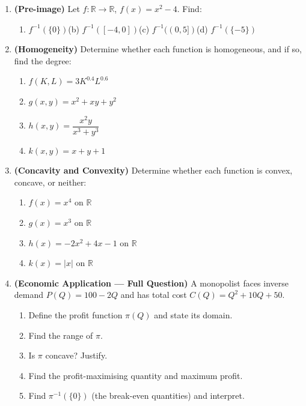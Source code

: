 \documentclass[12pt, a4paper]{article}
\theoremstyle{definition}
\newcommand{\R}{\mathbb{R}}
\begin{document}
\begin{enumerate}[label=\textbf{B\arabic*.}, leftmargin=2.5em]
  \item \textbf{(Pre-image)} Let $f:\R\to\R$, $f(x) = x^2 - 4$. Find:
  \begin{enumerate}[label=(\alph*)]
    \item $f^{-1}(\{0\})$\quad (b) $f^{-1}([-4, 0])$\quad (c) $f^{-1}((0,5])$\quad (d) $f^{-1}(\{-5\})$
  \end{enumerate}
\newpage
  \item \textbf{(Homogeneity)} Determine whether each function is homogeneous, and if so, find the degree:
  \begin{enumerate}[label=(\alph*)]
    \item $f(K,L) = 3K^{0.4}L^{0.6}$
    \item $g(x,y) = x^2 + xy + y^2$
    \item $h(x,y) = \dfrac{x^2 y}{x^3 + y^3}$
    \item $k(x,y) = x + y + 1$
  \end{enumerate}

  \item \textbf{(Concavity and Convexity)} Determine whether each function is convex, concave, or neither:
  \begin{enumerate}[label=(\alph*)]
    \item $f(x) = x^4$ on $\R$
    \item $g(x) = x^3$ on $\R$
    \item $h(x) = -2x^2 + 4x - 1$ on $\R$
    \item $k(x) = |x|$ on $\R$
  \end{enumerate}

  \item \textbf{(Economic Application --- Full Question)} A monopolist faces inverse demand $P(Q) = 100 - 2Q$ and has total cost $C(Q) = Q^2 + 10Q + 50$.
  \begin{enumerate}[label=(\alph*)]
    \item Define the profit function $\pi(Q)$ and state its domain.
    \item Find the range of $\pi$.
    \item Is $\pi$ concave? Justify.
    \item Find the profit-maximising quantity and maximum profit.
    \item Find $\pi^{-1}(\{0\})$ (the break-even quantities) and interpret.
  \end{enumerate}
\end{enumerate}
\end{document}
